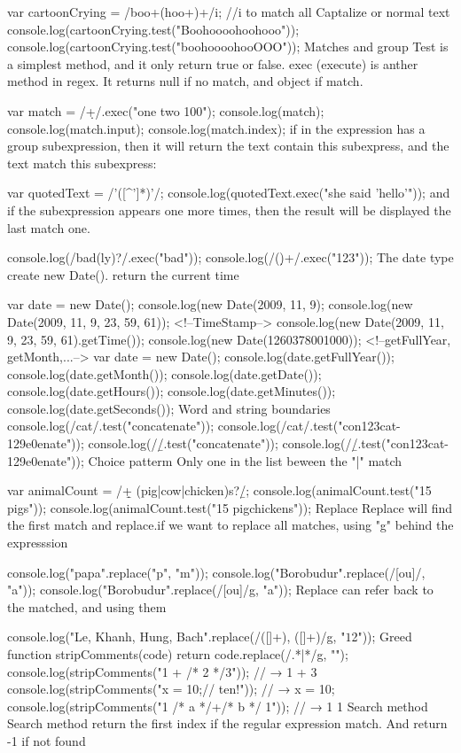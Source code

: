 var cartoonCrying = /boo+(hoo+)+/i; //i to match all Captalize or normal text
console.log(cartoonCrying.test("Boohoooohoohooo"));
console.log(cartoonCrying.test("boohoooohooOOO"));
Matches and group
Test is a simplest method, and it only return true or false.
exec (execute) is anther method in regex. It returns null if no match, and object if match.

var match  = /\d+/.exec("one two 100");
console.log(match);
console.log(match.input);
console.log(match.index);
if in the expression has a group subexpression, then it will return the text contain this subexpress, and the text match this subexpress:

var quotedText = /'([^']*)'/;
console.log(quotedText.exec("she said 'hello'"));
and if the subexpression appears one more times, then the result will be displayed the last match one.

console.log(/bad(ly)?/.exec("bad"));
console.log(/(\d)+/.exec("123"));
The date type
create new Date(). return the current time

var date =  new Date();
console.log(new Date(2009, 11, 9);
console.log(new Date(2009, 11, 9, 23, 59, 61));
<!--TimeStamp-->
console.log(new Date(2009, 11, 9, 23, 59, 61).getTime());
console.log(new Date(1260378001000));
<!--getFullYear, getMonth,...-->
var date = new Date();
console.log(date.getFullYear());
console.log(date.getMonth());
console.log(date.getDate());
console.log(date.getHours());
console.log(date.getMinutes());
console.log(date.getSeconds());
Word and string boundaries
console.log(/cat/.test("concatenate"));
console.log(/cat/.test("con123cat-129e0enate"));
console.log(/\bcat\b/.test("concatenate"));
console.log(/\bcat\b/.test("con123cat-129e0enate"));
Choice patterm
Only one in the list beween the "|" match

var animalCount = /\b\d+ (pig|cow|chicken)s?\b/;
console.log(animalCount.test("15 pigs"));
console.log(animalCount.test("15 pigchickens"));
Replace
Replace will find the first match and replace.if we want to replace all matches, using "g" behind the expresssion

console.log("papa".replace("p", "m"));
console.log("Borobudur".replace(/[ou]/, "a"));
console.log("Borobudur".replace(/[ou]/g, "a"));
Replace can refer back to the matched, and using them

console.log("Le, Khanh\nNguyen, Hung\nDuong, Bach".replace(/([\w]+), ([\w]+)/g, "$1 $2"));
Greed
function stripComments(code) {
  return code.replace(/\/\/.*|\/\*[^]*\*\//g, "");
}
console.log(stripComments("1 + /* 2 */3"));
// → 1 + 3
console.log(stripComments("x = 10;// ten!"));
// → x = 10;
console.log(stripComments("1 /* a */+/* b */ 1"));
// → 1  1
Search method
Search method return the first index if the regular expression match.
And return -1 if not found

